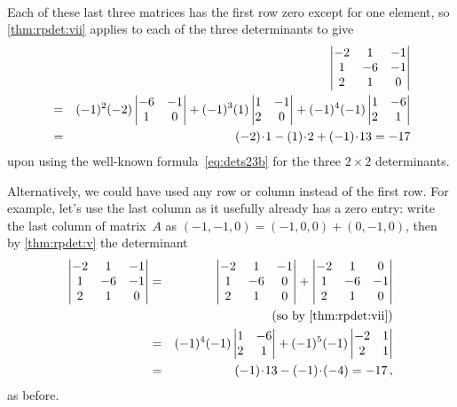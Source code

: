 \begin{example}
\begin{solution}
\begin{eqnarray*}
\end{eqnarray*}
Each of these last three matrices has the first row zero except for one element, so \autoref{thm:rpdet:vii} applies to each of the three determinants to give
\begin{eqnarray*}&&\hspace{-1em}
\begin{vmatrix}   -2&1&-1
\\   1 & -6 & -1
\\   2 &  1 & 0
\end{vmatrix}
\\&=&(-1)^2(-2)\begin{vmatrix}    -6 & -1
\\  1 & 0
\end{vmatrix}
+(-1)^3(1)\begin{vmatrix}    1 &  -1
\\   2 &  0
\end{vmatrix}
+(-1)^4(-1)\begin{vmatrix}   1 & -6 
\\   2 &  1 
\end{vmatrix}
\\&=&(-2)\cdot1-(1)\cdot2+(-1)\cdot13=-17
\end{eqnarray*}
upon using the well-known formula~\eqref{eq:dets23b} for the three \(2\times 2\) determinants.

Alternatively, we could have used any row or column instead of the first row.  
For example, let's use the last column as it usefully already has a zero entry: write the last column of matrix~\(A\) as \((-1,-1,0)=(-1,0,0)+(0,-1,0)\), then by \autoref{thm:rpdet:v} the determinant
\begin{eqnarray*}
\begin{vmatrix}   -2&1&-1
\\   1 & -6 & -1
\\   2 &  1 & 0
\end{vmatrix}
&=&\begin{vmatrix}   -2&1&-1
\\   1 & -6 & 0
\\   2 &  1 & 0
\end{vmatrix}
+\begin{vmatrix}   -2&1&0
\\   1 & -6 & -1
\\   2 &  1 & 0
\end{vmatrix}
\\&&\quad(\text{so by \autoref{thm:rpdet:vii}})
\\&=&(-1)^4(-1)\begin{vmatrix}
  1 & -6 
\\   2 &  1 
\end{vmatrix}
+(-1)^5(-1)\begin{vmatrix}   -2&1
\\   2 &  1 
\end{vmatrix}
\\&=&(-1)\cdot 13-(-1)\cdot(-4)=-17\,,
\end{eqnarray*}
as before.
\end{solution}
\end{example}






